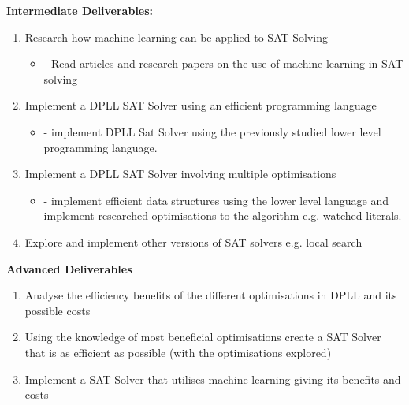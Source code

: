 \documentclass[12pt,a4paper]{article}
\begin{document}
{\bf Intermediate Deliverables:}
	\begin{enumerate}
		\item Research how machine learning can be applied to SAT Solving
			\begin{itemize}
				\item{- Read articles and research papers on the use of machine learning in SAT solving}
			\end{itemize}
		\item Implement a DPLL SAT Solver using an efficient programming language
			\begin{itemize}
				\item{- implement DPLL Sat Solver using the previously studied lower level programming language.}
			\end{itemize}
		\item Implement a DPLL SAT Solver involving multiple optimisations
			\begin{itemize}
				\item{- implement efficient data structures using the lower level language and implement researched optimisations to the algorithm e.g. watched literals.}
			\end{itemize}
		\item Explore and implement other versions of SAT solvers e.g. local search
	\end{enumerate}
{\bf Advanced Deliverables}
	\begin{enumerate}
		\item Analyse the efficiency benefits of the different optimisations in DPLL and its possible costs
		\item Using the knowledge of most beneficial optimisations create a SAT Solver that is as efficient as possible (with the optimisations explored)
		\item Implement a SAT Solver that utilises machine learning giving its benefits and costs
	\end{enumerate}





\end{document}
